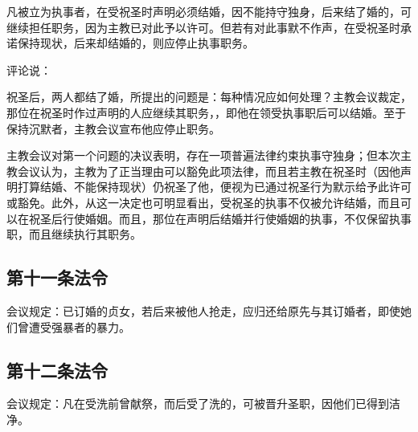凡被立为执事者，在受祝圣时声明必须结婚，因不能持守独身，后来结了婚的，可继续担任职务，因为主教已对此予以许可。但若有对此事默不作声，在受祝圣时承诺保持现状，后来却结婚的，则应停止执事职务。\par

评论说：\par

祝圣后，两人都结了婚，所提出的问题是：每种情况应如何处理？主教会议裁定，那位在祝圣时作过声明的人应继续其职务，，即他在领受执事职后可以结婚。至于保持沉默者，主教会议宣布他应停止职务。\par

主教会议对第一个问题的决议表明，存在一项普遍法律约束执事守独身；但本次主教会议认为，主教为了正当理由可以豁免此项法律，而且若主教在祝圣时（因他声明打算结婚、不能保持现状）仍祝圣了他，便视为已通过祝圣行为默示给予此许可或豁免。此外，从这一决定也可明显看出，受祝圣的执事不仅被允许结婚，而且可以在祝圣后行使婚姻。而且，那位在声明后结婚并行使婚姻的执事，不仅保留执事职，而且继续执行其职务。\par


\subsection{第十一条法令}

会议规定：已订婚的贞女，若后来被他人抢走，应归还给原先与其订婚者，即使她们曾遭受强暴者的暴力。\par

\par


\subsection{第十二条法令}

会议规定：凡在受洗前曾献祭，而后受了洗的，可被晋升圣职，因他们已得到洁净。\par


